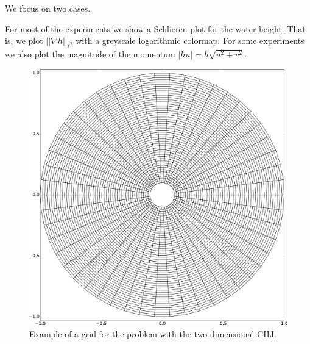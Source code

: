 \documentclass[preprint, 11pt]{article}
\newcommand{\bfu}{{u}}
\newcommand{\Fr}{{\rm Fr}}
\begin{document}
We focus on two cases.

For most of the experiments we show a Schlieren plot for the water height.
That is, we plot $||\nabla h||_{\ell^2}$ with a greyscale logarithmic colormap.
For some experiments we also plot the magnitude of the momentum $|h\bfu|=h\sqrt{u^2+v^2}$.

\begin{figure}[!h]
  \centering 
  \includegraphics[scale=0.15]{figures/mesh.png}
  \caption{
    Example of a grid for the problem with the two-dimensional CHJ.
    \label{fig:mesh_chj}}
\end{figure}
\end{document}
